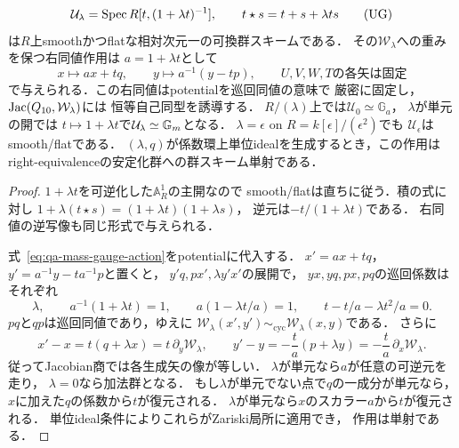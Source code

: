 \begin{theorem}[massを横断する滑らかなゲージ群]
\label{thm:qa-mass-gauge-smooth-group}
\[
 \mathcal U_\lambda
 =\operatorname{Spec} R[t,(1+\lambda t)^{-1}],\qquad
 t\star s=t+s+\lambda ts
 \tag{UG}\label{eq:qa-mass-gauge-group-law}
\]
は$R$上smoothかつflatな相対次元一の可換群スキームである．
その$\mathcal W_\lambda$への重みを保つ右同値作用は
$a=1+\lambda t$として
\[
 x\longmapsto ax+tq,\qquad
 y\longmapsto a^{-1}(y-tp),
 \qquad U,V,W,T\text{の各矢は固定}
 \tag{GA}\label{eq:qa-mass-gauge-action}
\]
で与えられる．この右同値はpotentialを巡回同値の意味で
厳密に固定し，$\operatorname{Jac}(Q_{10},\mathcal W_\lambda)$には
恒等自己同型を誘導する．
$R/(\lambda)$上では$\mathcal U_0\simeq\mathbb G_a$，
$\lambda$が単元の開では
$t\mapsto1+\lambda t$で$\mathcal U_\lambda\simeq\mathbb G_m$となる．
$\lambda=\epsilon$ on $R=k[\epsilon]/(\epsilon^2)$でも
$\mathcal U_\epsilon$はsmooth/flatである．
$(\lambda,q)$が係数環上単位idealを生成するとき，この作用は
right-equivalenceの安定化群への群スキーム単射である．
\end{theorem}
\begin{proof}
$1+\lambda t$を可逆化した$\mathbb A^1_R$の主開なので
smooth/flatは直ちに従う．積の式に対し
$1+\lambda(t\star s)=(1+\lambda t)(1+\lambda s)$，
逆元は$-t/(1+\lambda t)$である．
右同値の逆写像も同じ形式で与えられる．

式~\eqref{eq:qa-mass-gauge-action}をpotentialに代入する．
$x'=ax+tq$，$y'=a^{-1}y-ta^{-1}p$と置くと，
$y'q,px',\lambda y'x'$の展開で，
$yx,yq,px,pq$の巡回係数はそれぞれ
\[
 \lambda,\qquad
 a^{-1}(1+\lambda t)=1,\qquad
 a(1-\lambda t/a)=1,\qquad
 t-t/a-\lambda t^2/a=0 .
\]
$pq$と$qp$は巡回同値であり，ゆえに
$\mathcal W_\lambda(x',y')\sim_{\mathrm{cyc}}
\mathcal W_\lambda(x,y)$である．
さらに
\[
 x'-x=t(q+\lambda x)=t\,\partial_y\mathcal W_\lambda,
 \qquad
 y'-y=-\frac{t}{a}(p+\lambda y)
      =-\frac{t}{a}\,\partial_x\mathcal W_\lambda .
\]
従ってJacobian商では各生成矢の像が等しい．
$\lambda$が単元なら$a$が任意の可逆元を走り，
$\lambda=0$なら加法群となる．
もし$\lambda$が単元でない点で$q$の一成分が単元なら，
$x$に加えた$q$の係数から$t$が復元される．
$\lambda$が単元なら$x$のスカラー$a$から$t$が復元される．
単位ideal条件によりこれらがZariski局所に適用でき，
作用は単射である．
\end{proof}

